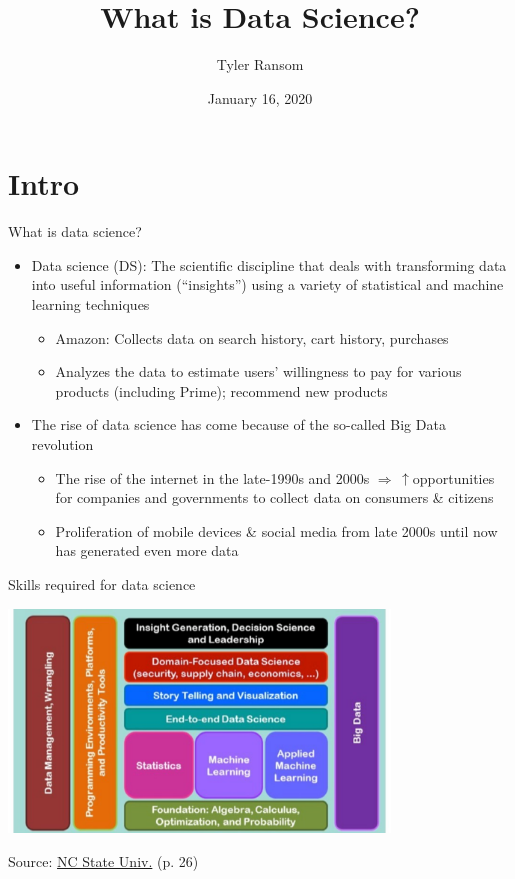 \documentclass[english,aspectratio=169,12pt,xcolor=dvipsnames]{beamer}
\title{What is Data Science?}
\author{Tyler Ransom}
\institute[OU Econ]{\normalsize{University of Oklahoma, Dept. of Economics}}
\date{January 16, 2020}
\begin{document}
{
\frame[noframenumbering]{\titlepage}
}


\section{Intro}
\begin{frame}{What is data science?}
\begin{itemize}
\item \alert{Data science (DS):} The scientific discipline that deals with transforming data into useful information (``insights'') using a variety of statistical and machine learning techniques
    \begin{itemize}
    \item \alert{Amazon:} Collects data on search history, cart history, purchases
    \item Analyzes the data to estimate users' willingness to pay for various products (including Prime); recommend new products
    \end{itemize}
\item The rise of data science has come because of the so-called Big Data revolution
    \begin{itemize}
    \item The rise of the internet in the late-1990s and 2000s $\Rightarrow \,\uparrow$opportunities for companies and governments to collect data on consumers \& citizens
    \item Proliferation of mobile devices \& social media from late 2000s until now has generated even more data
    \end{itemize}
\end{itemize}
\end{frame}


\begin{frame}{Skills required for data science}
\begin{center}
\includegraphics[width=0.76\textwidth]{../Graphics/NASEMdatasci.eps}
\end{center}
{\scriptsize Source: \href{http://sites.nationalacademies.org/cs/groups/cstbsite/documents/webpage/cstb_181680.pdf}{NC State Univ.} (p. 26)}
\end{frame}
\end{document}
